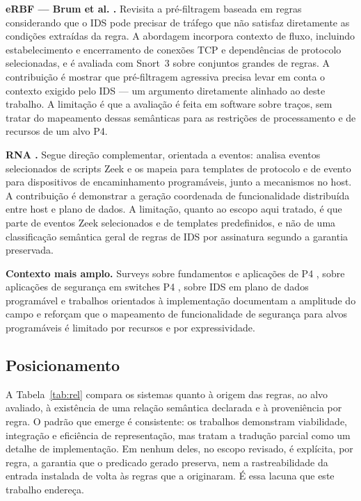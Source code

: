 \documentclass[12pt]{article}
\begin{document}
\textbf{eRBF --- Brum et al. \cite{brum2025rethinking}.} Revisita a
pré-filtragem baseada em regras considerando que o IDS pode precisar de
tráfego que não satisfaz diretamente as condições extraídas da regra. A
abordagem incorpora contexto de fluxo, incluindo estabelecimento e
encerramento de conexões TCP e dependências de protocolo selecionadas, e é
avaliada com Snort~3 sobre conjuntos grandes de regras. A contribuição é
mostrar que pré-filtragem agressiva precisa levar em conta o contexto exigido
pelo IDS --- um argumento diretamente alinhado ao deste trabalho. A limitação
é que a avaliação é feita em software sobre traços, sem tratar do mapeamento
dessas semânticas para as restrições de processamento e de recursos de um
alvo P4.

\textbf{RNA \cite{hagen2025rna}.} Segue direção complementar, orientada a
eventos: analisa eventos selecionados de scripts Zeek e os mapeia para
templates de protocolo e de evento para dispositivos de encaminhamento
programáveis, junto a mecanismos no host. A contribuição é demonstrar a
geração coordenada de funcionalidade distribuída entre host e plano de dados.
A limitação, quanto ao escopo aqui tratado, é que parte de eventos Zeek
selecionados e de templates predefinidos, e não de uma classificação semântica
geral de regras de IDS por assinatura segundo a garantia preservada.

\textbf{Contexto mais amplo.} Surveys sobre fundamentos e aplicações de
P4 \cite{hauser2023p4survey}, sobre aplicações de segurança em switches
P4 \cite{alsabeh2022p4securitysurvey}, sobre IDS em plano de dados
programável \cite{fida2026pdpids} e trabalhos orientados à
implementação \cite{mazloum2025p4security} documentam a amplitude do campo e
reforçam que o mapeamento de funcionalidade de segurança para alvos
programáveis é limitado por recursos e por expressividade.

\subsection{Posicionamento}

A Tabela~\ref{tab:rel} compara os sistemas quanto à origem das regras, ao alvo
avaliado, à existência de uma relação semântica declarada e à proveniência por
regra. O padrão que emerge é consistente: os trabalhos demonstram viabilidade,
integração e eficiência de representação, mas tratam a tradução parcial como
um detalhe de implementação. Em nenhum deles, no escopo revisado, é explícita,
por regra, a garantia que o predicado gerado preserva, nem a rastreabilidade
da entrada instalada de volta às regras que a originaram. É essa lacuna que
este trabalho endereça.
\end{document}
